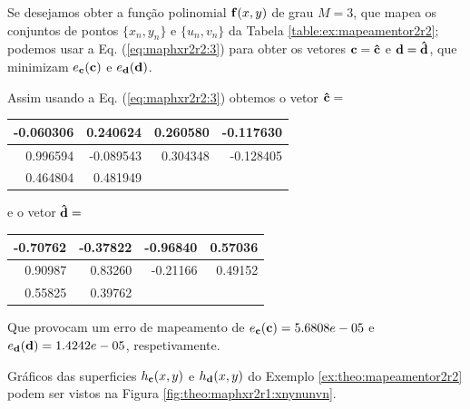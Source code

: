 \begin{minipage}{0.6\textwidth}
\begin{SolutionT}\label{sol:theo:mapeamentor2r2}
Se desejamos obter a função polinomial $\VECTOR{f}(x,y)$ de grau $M=3$,
que mapea os conjuntos de pontos $\{x_n,y_n\}$ e $\{u_n,v_n\}$ da Tabela \ref{table:ex:mapeamentor2r2}; 
podemos usar a Eq. (\ref{eq:maphxr2r2:3}) 
para obter os vetores $\VECTOR{c}=\VECTOR{\hat{c}}$ e $\VECTOR{d}=\VECTOR{\hat{d}}$,
que minimizam $e_{\VECTOR{c}}(\VECTOR{c})$ e $e_{\VECTOR{d}}(\VECTOR{d})$.


Assim usando a Eq. (\ref{eq:maphxr2r2:3}) obtemos o vetor $\VECTOR{\hat{c}}=$ 
\begin{center}
\begin{tabular}{ r r r r }
  \hline
  -0.060306 &   0.240624 &   0.260580 &  -0.117630 \\ \hline
   0.996594 &  -0.089543 &   0.304348 &  -0.128405 \\ \hline
   0.464804 &   0.481949 & ~ & ~ \\ \hline
\end{tabular}
\end{center}

e o vetor $\VECTOR{\hat{d}}=$ 
\begin{center}
\begin{tabular}{ r r r r }
\hline
  -0.70762 &  -0.37822 &  -0.96840 &   0.57036 \\ \hline
   0.90987 &   0.83260 &  -0.21166 &   0.49152  \\ \hline
   0.55825 &   0.39762 & ~ & ~ \\ \hline
\end{tabular}
\end{center}
Que provocam um erro de mapeamento 
de $e_{\VECTOR{c}}(\VECTOR{c})=5.6808e-05$ e $e_{\VECTOR{d}}(\VECTOR{d})=1.4242e-05$, respetivamente.

Gráficos das superficies $h_{\VECTOR{c}}(x,y)$ e $h_{\VECTOR{d}}(x,y)$ 
do Exemplo \ref{ex:theo:mapeamentor2r2} podem ser vistos na Figura \ref{fig:theo:maphxr2r1:xnynunvn}.
\end{SolutionT}
\end{minipage}

